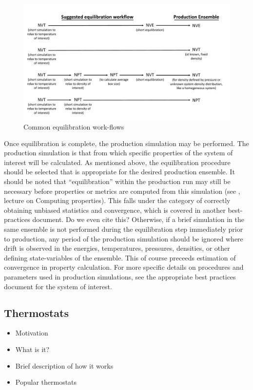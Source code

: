 \documentclass[9pt,bestpractices]{livecoms}
\begin{document}
\begin{figure}[h]
\centering
\includegraphics[width=\linewidth]{Equilibration_Workflow.pdf}
\caption{Common equilibration work-flows}
\label{eqworkflow}
\end{figure}

Once equilibration is complete, the production simulation may be performed.
The production simulation is that from which specific properties of the system of interest will be calculated.
As mentioned above, the equilibration procedure should be selected that is appropriate for the desired production ensemble.
It should be noted that ``equilibration'' within the production run may still be necessary before properties or metrics are computed from this simulation (see \citet{ShellNotes}, lecture on Computing properties).
This falls under the category of correctly obtaining unbiased statistics and
convergence, which is covered in another best-practices document. %
Do we even cite this?
Otherwise, if a brief simulation in the same ensemble is not performed during the equilibration step immediately prior to production, any period of the production simulation should be ignored where drift is observed in the energies, temperatures, pressures, densities, or other defining state-variables of the ensemble.
This of course preceeds estimation of convergence in property calculation.
For more specific details on procedures and parameters used in production simulations, see the appropriate best practices document for the system of interest.

\subsection{Thermostats}
\begin{itemize}
\item Motivation
\item What is it?
\item Brief description of how it works
\item Popular thermostats
\end{itemize}
\end{document}
